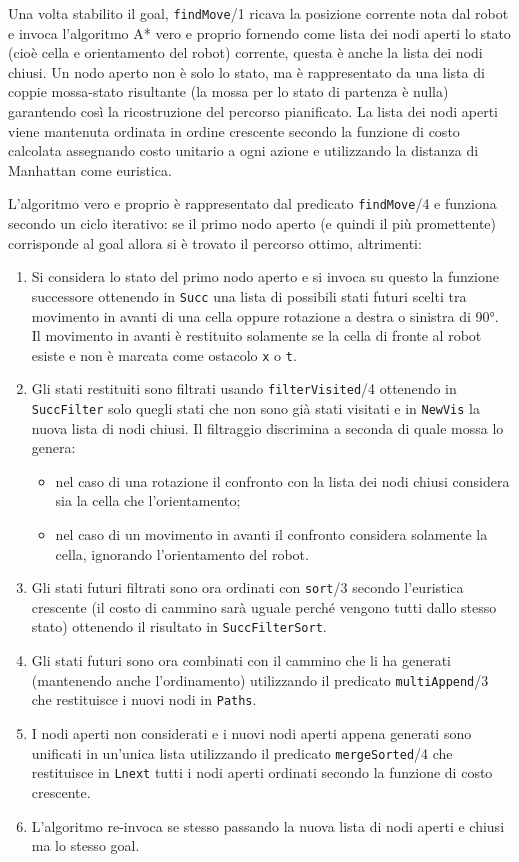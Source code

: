 Una volta stabilito il goal, \texttt{findMove}/1 ricava la posizione corrente nota dal robot e invoca l'algoritmo A* vero e proprio fornendo come lista dei nodi aperti lo stato (cioè cella e orientamento del robot) corrente, questa è anche la lista dei nodi chiusi. Un nodo aperto non è solo lo stato, ma è rappresentato da una lista di coppie mossa-stato risultante (la mossa per lo stato di partenza è nulla) garantendo così la ricostruzione del percorso pianificato. La lista dei nodi aperti viene mantenuta ordinata in ordine crescente secondo la funzione di costo calcolata assegnando costo unitario a ogni azione e utilizzando la distanza di Manhattan come euristica.

L'algoritmo vero e proprio è rappresentato dal predicato \texttt{findMove}/4 e funziona secondo un ciclo iterativo: se il primo nodo aperto (e quindi il più promettente) corrisponde al goal allora si è trovato il percorso ottimo, altrimenti:
\begin{enumerate}
	\item Si considera lo stato del primo nodo aperto e si invoca su questo la funzione successore ottenendo in \texttt{Succ} una lista di possibili stati futuri scelti tra movimento in avanti di una cella oppure rotazione a destra o sinistra di \ang{90}. Il movimento in avanti è restituito solamente se la cella di fronte al robot esiste e non è marcata come ostacolo \texttt{x} o \texttt{t}.
	\item Gli stati restituiti sono filtrati usando \texttt{filterVisited}/4 ottenendo in \texttt{SuccFilter} solo quegli stati che non sono già stati visitati e in \texttt{NewVis} la nuova lista di nodi chiusi. Il filtraggio discrimina a seconda di quale mossa lo genera:
	\begin{itemize}
		\item nel caso di una rotazione il confronto con la lista dei nodi chiusi considera sia la cella che l'orientamento;
		\item nel caso di un movimento in avanti il confronto considera solamente la cella, ignorando l'orientamento del robot.
	\end{itemize}
	\item Gli stati futuri filtrati sono ora ordinati con \texttt{sort}/3 secondo l'euristica crescente (il costo di cammino sarà uguale perché vengono tutti dallo stesso stato) ottenendo il risultato in \texttt{SuccFilterSort}.
	\item Gli stati futuri sono ora combinati con il cammino che li ha generati (mantenendo anche l'ordinamento) utilizzando il predicato \texttt{multiAppend}/3 che  restituisce i nuovi nodi in \texttt{Paths}.
	\item I nodi aperti non considerati e i nuovi nodi aperti appena generati sono unificati in un'unica lista utilizzando il predicato \texttt{mergeSorted}/4 che restituisce in \texttt{Lnext} tutti i nodi aperti ordinati secondo la funzione di costo crescente.
	\item L'algoritmo re-invoca se stesso passando la nuova lista di nodi aperti e chiusi ma lo stesso goal.
\end{enumerate}

